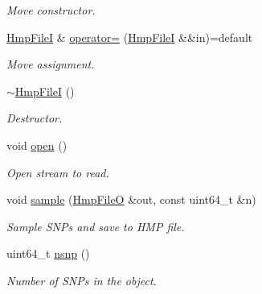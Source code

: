 \begin{DoxyCompactItemize}
\begin{DoxyCompactList}\small\item\em Move constructor. \end{DoxyCompactList}\item 
\mbox{\label{classsamp_files_1_1_hmp_file_i_abb726792996c45a55ab741296f39a875}} 
\hyperlink{classsamp_files_1_1_hmp_file_i}{Hmp\+FileI} \& \hyperlink{classsamp_files_1_1_hmp_file_i_abb726792996c45a55ab741296f39a875}{operator=} (\hyperlink{classsamp_files_1_1_hmp_file_i}{Hmp\+FileI} \&\&in)=default
\begin{DoxyCompactList}\small\item\em Move assignment. \end{DoxyCompactList}\item 
\mbox{\label{classsamp_files_1_1_hmp_file_i_aa8fd3c3e48c2efc2c45f38be30be66a1}} 
\hyperlink{classsamp_files_1_1_hmp_file_i_aa8fd3c3e48c2efc2c45f38be30be66a1}{$\sim$\+Hmp\+FileI} ()
\begin{DoxyCompactList}\small\item\em Destructor. \end{DoxyCompactList}\item 
\mbox{\label{classsamp_files_1_1_hmp_file_i_a6bf4de03c605ed70d74766c94f1e12ae}} 
void \hyperlink{classsamp_files_1_1_hmp_file_i_a6bf4de03c605ed70d74766c94f1e12ae}{open} ()
\begin{DoxyCompactList}\small\item\em Open stream to read. \end{DoxyCompactList}\item 
void \hyperlink{classsamp_files_1_1_hmp_file_i_afd02563de7ecb89a94e8af4110676710}{sample} (\hyperlink{classsamp_files_1_1_hmp_file_o}{Hmp\+FileO} \&out, const uint64\+\_\+t \&n)
\begin{DoxyCompactList}\small\item\em Sample S\+N\+Ps and save to H\+MP file. \end{DoxyCompactList}\item 
\mbox{\label{classsamp_files_1_1_hmp_file_i_a1439d1c790c82a8c3c5634d65fc99606}} 
uint64\+\_\+t \hyperlink{classsamp_files_1_1_hmp_file_i_a1439d1c790c82a8c3c5634d65fc99606}{nsnp} ()
\begin{DoxyCompactList}\small\item\em Number of S\+N\+Ps in the object. \end{DoxyCompactList}\end{DoxyCompactItemize}
